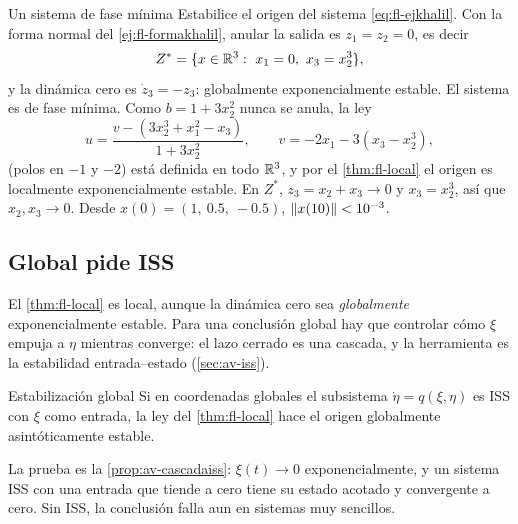 \begin{ejemplo}[label=ej:fl-faseminima]{Un sistema de fase mínima}
Estabilice el origen del sistema \eqref{eq:fl-ejkhalil}.
\solucion Con la forma normal del \cref{ej:fl-formakhalil}, anular la salida es $z_1=z_2=0$, es decir
\[
  Z^*=\{x\in\R^3:\ x_1=0,\ x_3=x_2^3\},
\]
y la dinámica cero es $\dot z_3=-z_3$: globalmente exponencialmente estable. El sistema es de fase mínima. Como $b=1+3x_2^2$ nunca se anula, la ley
\[
  u=\frac{v-(3x_2^3+x_1^2-x_3)}{1+3x_2^2},\qquad v=-2x_1-3(x_3-x_2^3),
\]
(polos en $-1$ y $-2$) está definida en todo $\mathbb{R}^3$, y por el \cref{thm:fl-local} el origen es localmente exponencialmente estable. En $Z^*$, $z_3=x_2+x_3\to0$ y $x_3=x_2^3$, así que $x_2,x_3\to0$. Desde $x(0)=(1,\ 0.5,\ -0.5)$, $\left\lVert x(10)\right\rVert<10^{-3}$.
\end{ejemplo}


\subsection{Global pide ISS}

El \cref{thm:fl-local} es local, aunque la dinámica cero sea \emph{globalmente} exponencialmente estable. Para una conclusión global hay que controlar cómo $\xi$ empuja a $\eta$ mientras converge: el lazo cerrado es una cascada, y la herramienta es la estabilidad entrada--estado (\cref{sec:av-iss}).

\begin{proposicion}[label=prop:fl-global]{Estabilización global \citep[Lema~4.7]{Kha02}}
Si en coordenadas globales el subsistema $\dot\eta=q(\xi,\eta)$ es ISS con $\xi$ como entrada, la ley del \cref{thm:fl-local} hace el origen globalmente asintóticamente estable.
\end{proposicion}

La prueba es la \cref{prop:av-cascadaiss}: $\xi(t)\to0$ exponencialmente, y un sistema ISS con una entrada que tiende a cero tiene su estado acotado y convergente a cero. Sin ISS, la conclusión falla aun en sistemas muy sencillos.

